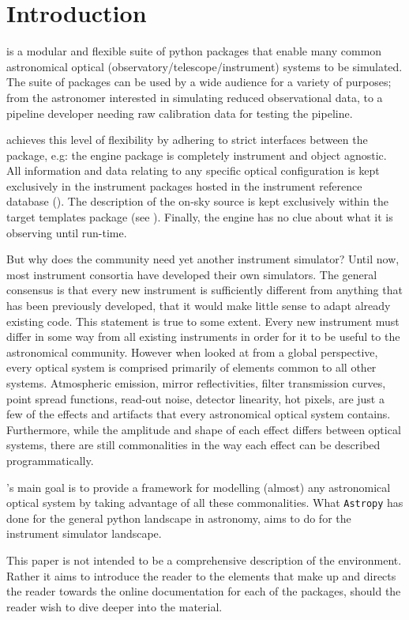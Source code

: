 

\section{Introduction}
\label{introduction}

\ScopeSim{} is a modular and flexible suite of python packages that enable many common astronomical optical (observatory/telescope/instrument) systems to be simulated.
The suite of packages can be used by a wide audience for a variety of purposes; from the astronomer interested in simulating reduced observational data, to a pipeline developer needing raw calibration data for testing the pipeline.

\ScopeSim{} achieves this level of flexibility by adhering to strict interfaces between the package, e.g: the \ScopeSim{} engine package is completely instrument and object agnostic.
All information and data relating to any specific optical configuration is kept exclusively in the instrument packages hosted in the instrument reference database (\IRDB{}).
The description of the on-sky source is kept exclusively within the target templates package (see \ScopeSimtemplates{}).
Finally, the engine has no clue about what it is observing until run-time.

But why does the community need yet another instrument simulator?
Until now, most instrument consortia have developed their own simulators.
The general consensus is that every new instrument is sufficiently different from anything that has been previously developed, that it would make little sense to adapt already existing code.
This statement is true to some extent.
Every new instrument must differ in some way from all existing instruments in order for it to be useful to the astronomical community.
However when looked at from a global perspective, every optical system is comprised primarily of elements common to all other systems.
Atmospheric emission, mirror reflectivities, filter transmission curves, point spread functions, read-out noise, detector linearity, hot pixels, are just a few of the effects and artifacts that every astronomical optical system contains.
Furthermore, while the amplitude and shape of each effect differs between optical systems, there are still commonalities in the way each effect can be described programmatically.

\ScopeSim{}'s main goal is to provide a framework for modelling (almost) any astronomical optical system by taking advantage of all these commonalities.
What \lstinline{Astropy} has done for the general python landscape in astronomy, \ScopeSim{} aims to do for the instrument simulator landscape.

This paper is not intended to be a comprehensive description of the \ScopeSim{} environment. Rather it aims to introduce the reader to the elements that make up \ScopeSim{} and directs the reader towards the online documentation for each of the packages, should the reader wish to dive deeper into the material.
